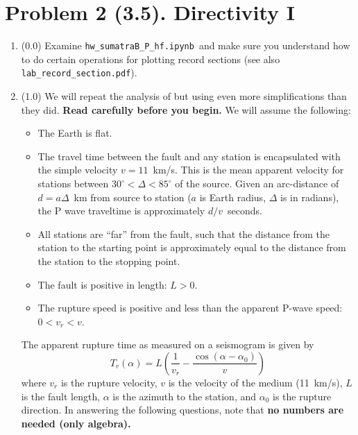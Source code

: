 \documentclass[11pt,titlepage,fleqn]{article}
\newcommand{\tfilehf}{{\tt hw\_sumatraB\_P\_hf.ipynb}}
\begin{document}

\pagebreak
\section*{Problem 2 (3.5). Directivity I}

\begin{enumerate}
\item (0.0) Examine \tfilehf\ and make sure you understand how to do certain operations for plotting record sections (see also \verb+lab_record_section.pdf+).

\item (1.0) We will repeat the analysis of \citet{Ni2005} but using even more simplifications than they did. {\bf Read \citet{Ni2005} carefully before you begin.} We will assume the following:
%
\begin{itemize}
\item The Earth is flat.
\item The travel time between the fault and any station is encapsulated with the simple velocity $v = 11$~km/s. This is the mean apparent velocity for stations between $30^\circ < \Delta < 85^\circ$ of the source. Given an arc-distance of $d = a\Delta$~km from source to station ($a$ is Earth radius, $\Delta$ is in radians), the P wave traveltime is approximately $d/v$~seconds.
\item All stations are ``far'' from the fault, such that the distance from the station to the starting point is approximately equal to the distance from the station to the stopping point.
\item The fault is positive in length: $L > 0$.
\item The rupture speed is positive and less than the apparent P-wave speed: $0 < v_r < v$.
\end{itemize}
%
The apparent rupture time as measured on a seismogram is given by \citep[][Section 4.3.2]{SteinWysession}
%
\begin{equation}
T_r(\alpha) = L\left(\frac{1}{v_r} - \frac{\cos(\alpha-\alpha_0)}{v}\right)
\label{Tr}
\end{equation}
%
where $v_r$ is the rupture velocity, $v$ is the velocity of the medium (11~km/s), $L$ is the fault length, $\alpha$ is the azimuth to the station, and $\alpha_0$ is the rupture direction. In answering the following questions, note that {\bf no numbers are needed (only algebra).}

\end{enumerate}
\end{document}
